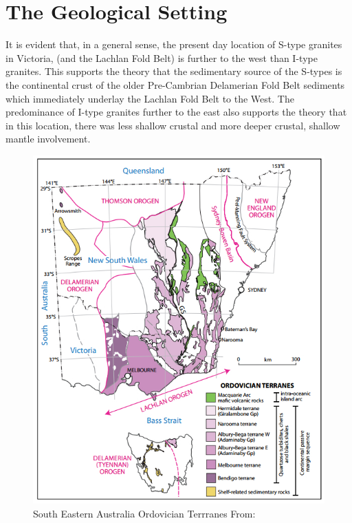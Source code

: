 \documentclass[a4paper]{article}
\begin{document}
\section{The Geological Setting}

It is evident that, in a general sense, the present day location of S-type granites in Victoria, (and the Lachlan Fold Belt) is further to the west than I-type granites. This supports the theory that the sedimentary source of the S-types is the continental crust of the older Pre-Cambrian Delamerian Fold Belt sediments which immediately underlay the Lachlan Fold Belt to the West. The predominance of I-type granites further to the east also supports the theory that in this location, there was less shallow crustal and more deeper crustal, shallow mantle involvement.

\begin{figure}[H]
\centering
\includegraphics[width=1\textwidth]{SEAustraliaOrdovicianTerrannes.jpg}
\caption{\label{fig:SEAustraliaOrdovicianTerrannes}South Eastern Australia Ordovician Terrranes From: \cite{aitchison2012accordion}}
\end{figure}
\end{document}
